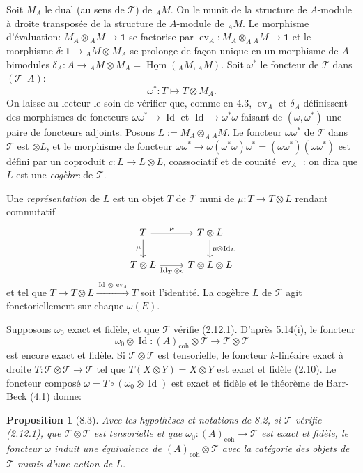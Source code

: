 \documentclass[12pt,a4paper]{article}
\theoremstyle{plain}
\newtheorem{proposition}[theorem]{Proposition}
\theoremstyle{definition}
\DeclareMathOperator{\Hom}{Hom}
\DeclareMathOperator{\Id}{Id}
\DeclareMathOperator{\ev}{ev}
\newcommand{\coh}{\mathrm{coh}}
\begin{document}
Soit $M_A$ le dual (au sens de $\mathcal{T}$) de $_A M$. On le munit de la structure de $A$-module à droite transposée de la structure de $A$-module de $_A M$. Le morphisme d'évaluation: $M_A \otimes {_A M} \to \mathbf{1}$ se factorise par $\ev_A : M_A \otimes_A {_A M} \to \mathbf{1}$ et le morphisme $\delta : \mathbf{1} \to {_A M} \otimes M_A$ se prolonge de façon unique en un morphisme de $A$-bimodules $\delta_A : A \to {_A M} \otimes M_A = \underline{\Hom}({_A M}, {_A M})$. Soit $\omega^*$ le foncteur de $\mathcal{T}$ dans $(\mathcal{T} \text{--} A)$:
\[
\omega^* : T \mapsto T \otimes M_A.
\]
On laisse au lecteur le soin de vérifier que, comme en 4.3, $\ev_A$ et $\delta_A$ définissent des morphismes de foncteurs $\omega\omega^* \to \Id$ et $\Id \to \omega^*\omega$ faisant de $(\omega, \omega^*)$ une paire de foncteurs adjoints. Posons $L := M_A \otimes_A {_A M}$. Le foncteur $\omega\omega^*$ de $\mathcal{T}$ dans $\mathcal{T}$ est $\otimes L$, et le morphisme de foncteur $\omega\omega^* \to \omega(\omega^*\omega)\omega^* = (\omega\omega^*)(\omega\omega^*)$ est défini par un coproduit $c : L \to L \otimes L$, coassociatif et de counité $\ev_A$ : on dira que $L$ est une \emph{cogèbre} de $\mathcal{T}$.

Une \emph{représentation} de $L$ est un objet $T$ de $\mathcal{T}$ muni de $\mu : T \to T \otimes L$ rendant commutatif
\[
\begin{tikzcd}
T \arrow[r, "\mu"] \arrow[d, "\mu"'] & T \otimes L \arrow[d, "\mu \otimes \Id_L"] \\
T \otimes L \arrow[r, "\Id_T \otimes c"'] & T \otimes L \otimes L
\end{tikzcd}
\]
et tel que $T \to T \otimes L \xrightarrow{\Id \otimes \ev_A} T$ soit l'identité. La cogèbre $L$ de $\mathcal{T}$ agit fonctoriellement sur chaque $\omega(E)$.

Supposons $\omega_0$ exact et fidèle, et que $\mathcal{T}$ vérifie (2.12.1). D'après 5.14(i), le foncteur
\[
\omega_0 \otimes \Id : (A)_{\coh} \otimes \mathcal{T} \to \mathcal{T} \otimes \mathcal{T}
\]
est encore exact et fidèle. Si $\mathcal{T} \otimes \mathcal{T}$ est tensorielle, le foncteur $k$-linéaire exact à droite $T : \mathcal{T} \otimes \mathcal{T} \to \mathcal{T}$ tel que $T(X \otimes Y) = X \otimes Y$ est exact et fidèle (2.10). Le foncteur composé $\omega = T \circ (\omega_0 \otimes \Id)$ est exact et fidèle et le théorème de Barr-Beck (4.1) donne:

\begin{proposition}[8.3]
Avec les hypothèses et notations de 8.2, si $\mathcal{T}$ vérifie (2.12.1), que $\mathcal{T} \otimes \mathcal{T}$ est tensorielle et que $\omega_0 : (A)_{\coh} \to \mathcal{T}$ est exact et fidèle, le foncteur $\omega$ induit une équivalence de $(A)_{\coh} \otimes \mathcal{T}$ avec la catégorie des objets de $\mathcal{T}$ munis d'une action de $L$.
\end{proposition}
\end{document}
